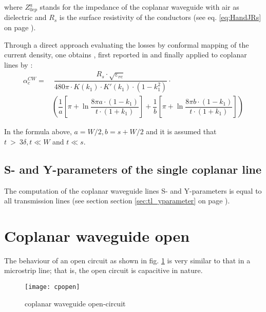 where $Z^a_{0cp}$ stands for the impedance of the coplanar waveguide
with air as dielectric and $R_s$ is the surface resistivity of the
conductors (see eq. \eqref{eq:HandJRs} on page \pageref{eq:HandJRs}).

\addvspace{12pt}

Through a direct approach evaluating the losses by conformal mapping
of the current density, one obtains \cite{Gupta1}, first reported in
\cite{Owyang} and finally applied to coplanar lines by \cite{Ghione1}:
\begin{equation}
\begin{split}
\alpha_c^{CW} = &\; \dfrac{R_s\cdot \sqrt{\varepsilon_{re}}}{480 \pi\cdot K(k_1)\cdot K'(k_1)\cdot \left(1 - k_1^2\right)} \cdot\\
& \left(\dfrac{1}{a}\left[\pi + \ln \dfrac {8 \pi a\cdot \left(1-k_1\right)}{t\cdot\left(1+k_1\right)}\right]+\dfrac{1}{b}\left[\pi + \ln \dfrac {8 \pi b\cdot \left(1-k_1\right)}{t\cdot\left(1+k_1\right)}\right]\right)
\end{split}
\end{equation}

In the formula above, $a = W/2, b = s + W/2$ and it is assumed that
$t~>~3 \delta, t \ll W$ and $t \ll s$.

\subsection{S- and Y-parameters of the single coplanar line}

The computation of the coplanar waveguide lines S- and Y-parameters is
equal to all transmission lines (see section
section \ref{sec:tl_yparameter} on page \pageref{sec:tl_yparameter}).

\section{Coplanar waveguide open}

The behaviour of an open circuit as shown in fig. \ref{fig:CPWopen} is
very similar to that in a microstrip line; that is, the open circuit
is capacitive in nature.

\begin{figure}[ht]
\begin{center}
\texttt{[image: cpopen]}
\end{center}
\caption{coplanar waveguide open-circuit}
\label{fig:CPWopen}
\end{figure}
\FloatBarrier

